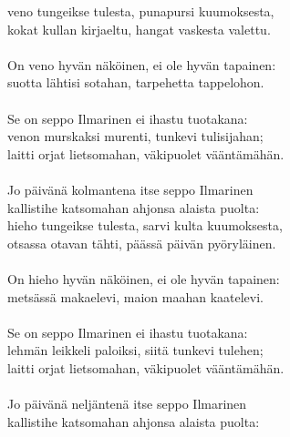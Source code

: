veno tungeikse tulesta, punapursi kuumoksesta,                    \\
kokat kullan kirjaeltu, hangat vaskesta valettu.                  \\
                                                                  \\
On veno hyvän näköinen, ei ole hyvän tapainen:                    \\
suotta lähtisi sotahan, tarpehetta tappelohon.                    \\
                                                                  \\
Se on seppo Ilmarinen ei ihastu tuotakana:                        \\
venon murskaksi murenti, tunkevi tulisijahan;                     \\
laitti orjat lietsomahan, väkipuolet vääntämähän.                 \\
                                                                  \\
Jo päivänä kolmantena itse seppo Ilmarinen                        \\
kallistihe katsomahan ahjonsa alaista puolta:                     \\
hieho tungeikse tulesta, sarvi kulta kuumoksesta,                 \\
otsassa otavan tähti, päässä päivän pyöryläinen.                  \\
                                                                  \\
On hieho hyvän näköinen, ei ole hyvän tapainen:                   \\
metsässä makaelevi, maion maahan kaatelevi.                       \\
                                                                  \\
Se on seppo Ilmarinen ei ihastu tuotakana:                        \\
lehmän leikkeli paloiksi, siitä tunkevi tulehen;                  \\
laitti orjat lietsomahan, väkipuolet vääntämähän.                 \\
                                                                  \\
Jo päivänä neljäntenä itse seppo Ilmarinen                        \\
kallistihe katsomahan ahjonsa alaista puolta:                     \\
